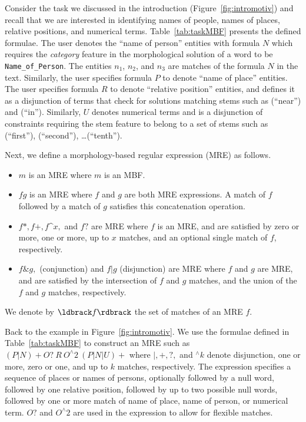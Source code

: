 Consider the task we discussed in the introduction (Figure~\ref{fig:intromotiv}) 
and recall that we are interested in identifying names of people, names of places, relative positions, and numerical terms.
Table~\ref{tab:taskMBF} presents the defined formulae.
The user denotes the ``name of person'' entities with formula $N$ 
which requires the {\em category} feature in the morphological solution of a word to be {\tt Name\_of\_Person}.
The entities $n_1$, $n_2$, and $n_3$ are matches of the formula $N$ in the text.
Similarly, the user specifies formula $P$ to denote ``name of place'' entities. 
The user specifies formula $R$ to denote ``relative position'' entities, 
and defines it as a disjunction of terms that check for 
solutions matching stems such as  (``near'') and  (``in'').
Similarly, $U$ denotes numerical terms and is a disjunction of constraints 
requiring the stem feature to belong to a set of stems such as
(``first''), (``second''), \dots {}(``tenth'').


Next, we define a morphology-based regular expression (MRE) as follows.
\begin{itemize}
\item $m$ is an MRE where $m$ is an MBF.
\item $fg$ is an MRE where $f$ and $g$ are both MRE expressions.
A match of $f$ followed by a match of $g$ satisfies this concatenation operation.
\item $f*,f+,f$\textasciicircum$x,$ and $f?$ are MRE where $f$ is an MRE,
  and are satisfied by zero or more, one or more, up to $x$ matches, 
    and an optional single match of $f$, respectively.
  \item $f\& g,$ (conjunction) and $f|g$ (disjunction) are MRE where 
    $f$ and $g$ are MRE, and are satisfied by the intersection of $f$ and $g$ matches, 
    and the union of the $f$ and $g$ matches, respectively. 
\end{itemize}
We denote by $\ldbrack f\rdbrack$ the set of matches of an MRE $f$.

Back to the example in Figure~\ref{fig:intromotiv}.
We use the formulae defined in Table~\ref{tab:taskMBF} to construct an MRE such as
$(P|N)\!+O?~R~O^\wedge\!2~(P|N|U)+$ where 
$|,+,?,$ and $^\wedge k$ denote disjunction, one or more, zero or one, and
up to $k$ matches, respectively.
The expression specifies a sequence of places or names of persons, 
optionally followed by a null word, 
followed by one relative position, followed by up to two possible null words, 
followed by one or more match of name of place, name of person, or numerical term.
$O?$ and $O^\wedge 2$ are used in the expression to allow for flexible matches.

